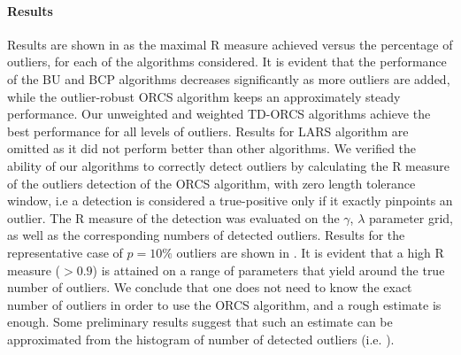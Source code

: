 \paragraph{Results}
Results are shown in
 as the maximal R measure achieved versus the percentage
of outliers, for each of the algorithms considered. It is evident that the
performance of the BU and BCP algorithms decreases significantly as
more outliers are added, while the outlier-robust ORCS algorithm
keeps an approximately steady performance. Our unweighted and weighted TD-ORCS algorithms
achieve the best performance for all levels of
outliers. Results for LARS algorithm are omitted as it did not perform better than other algorithms.
We verified the ability of our algorithms to correctly detect outliers
by calculating the R measure of the outliers detection of the ORCS algorithm, with zero
length tolerance window, i.e a detection is considered a true-positive
only if it exactly pinpoints an outlier.
The R measure of the detection was evaluated on the $\gamma$, $\lambda$ parameter
grid, as well as the corresponding numbers of detected outliers. Results for the representative case of $p=10\%$ outliers are shown in
.
It is evident that a high R measure ($>0.9$) is attained on a range of
parameters that yield around the true number of outliers. We conclude that one does not
need to know the exact number of outliers %
in order to use the ORCS algorithm, and a rough estimate is enough. Some
preliminary results suggest that such an estimate can be approximated
from the histogram of number of detected outliers
(i.e. ).

